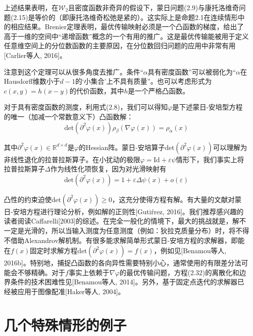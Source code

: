 \documentclass[cn,10pt,math=newtx,citestyle=gb7714-2015,bibstyle=gb7714-2015]{elegantbook}
\begin{document}
\vspace{2em}

上述结果表明，在$\mathcal{W}_2$且密度函数非奇异的假设下，蒙日问题(2.9)与康托洛维奇问题(2.15)是等价的（即康托洛维奇松弛是紧的）。这实际上是命题2.1在连续情形中的相应结果。Brenier定理表明，最优传输映射必须是一个凸函数的梯度，给出了高于一维的空间中“递增函数”概念的一个有用的推广。这是最优传输能被用于定义任意维空间上的分位数函数的主要原因，在分位数回归问题的应用中非常有用[Carlier等人, 2016]。

注意到这个定理可以从很多角度去推广。条件“$\alpha$具有密度函数”可以被弱化为“$\alpha$在Hausdorff维数小于$d-1$的‘小集合’上不具有质量”。也可以考虑形式为$c(x,y)=h(x-y)$的代价函数，其中$h$是一个严格凸函数。

\begin{postulate}[蒙日-安培方程]
对于具有密度函数的测度，利用式(2.8)，我们可以得知$\varphi$是下述蒙日-安培型方程的唯一（加减一个常数意义下）凸函数解：
\begin{equation}
    \label{2.32}
    \text{det}(\partial^2 \varphi(x))\rho_\beta(\nabla \varphi(x))=\rho_\alpha(x)
\end{equation}

其中$\partial^2\varphi(x)\in\mathbb{R}^{d\times d}$是$\varphi$的Hessian阵。蒙日-安培算子$\text{det}(\partial^2 \varphi(x))$可以理解为非线性退化的拉普拉斯算子。在小扰动的极限$\varphi=\text{Id}+\varepsilon\psi$情形下，我们事实上将拉普拉斯算子$\Delta$作为线性化项恢复，因为对光滑映射有
\begin{equation*}
    \text{det}(\partial^2\varphi(x))=1+\varepsilon \Delta \psi(x)+o(\varepsilon)
\end{equation*}

凸性的约束迫使$\text{det}(\partial^2\varphi(x))\geq 0$，这充分使得方程有解。有大量的文献对蒙日-安培方程进行理论分析，例如解的正则性[Guti\'rrez, 2016]。我们推荐感兴趣的读者阅读Caffarelli[2003]的综述。在完全一般化的情境下，最大的挑战就是，解不一定是光滑的，所以当输入测度为任意测度（例如：狄拉克质量分布）时，将不得不借助Alexandrov解机制。有很多能求解简单形式蒙日-安培方程的求解器，即能在$f(x)$固定时求解方程$\text{det}(\partial^2\varphi(x))=f(x)$，例如见[Benamou等人, 2016b]。特别地，捕捉凸函数的各向异性需要特别小心，通常使用的有限差分法可能会不够精确。对于$f$事实上依赖于$\nabla \varphi$的最优传输问题，方程(2.32)的离散化和边界条件的技术困难性见[Benamou等人, 2014]。另外，基于固定点迭代的求解器已经被应用于图像配准[Haker等人, 2004]。
\end{postulate}

\section{几个特殊情形的例子}
\end{document}

